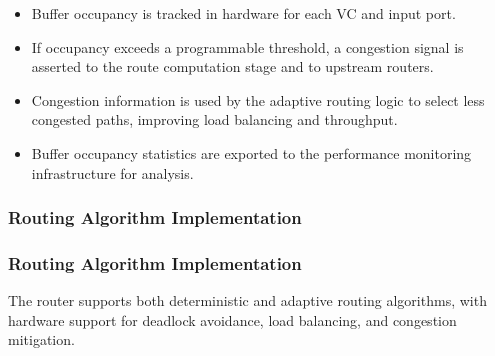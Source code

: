 \documentclass[11pt,a4paper]{article}
\begin{document}
\begin{itemize}
\begin{itemize}
        \item Buffer occupancy is tracked in hardware for each VC and input port.
        \item If occupancy exceeds a programmable threshold, a congestion signal is asserted to the route computation stage and to upstream routers.
        \item Congestion information is used by the adaptive routing logic to select less congested paths, improving load balancing and throughput.
        \item Buffer occupancy statistics are exported to the performance monitoring infrastructure for analysis.
    \end{itemize}
\end{itemize}

\subsubsection{Routing Algorithm Implementation}

\subsubsection{Routing Algorithm Implementation}

The router supports both deterministic and adaptive routing algorithms, with hardware support for deadlock avoidance, load balancing, and congestion mitigation.
\end{document}
